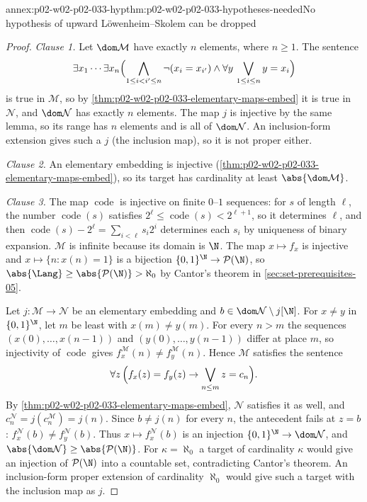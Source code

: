 \begin{annexitem}{annex:p02-w02-p02-033-hyp}{thm:p02-w02-p02-033-hypotheses-needed}{No hypothesis of upward L\"owenheim--Skolem can be dropped}
\begin{proof}
\emph{Clause 1.}  Let \(\dom\mathcal M\) have exactly \(n\) elements, where
\(n\geq1\).  The sentence
\[
 \exists x_1\cdots\exists x_n\Bigl(\bigwedge_{1\leq i<i'\leq n}\neg(x_i=x_{i'})
 \land\forall y\,\bigvee_{1\leq i\leq n}y=x_i\Bigr)
\]
is true in \(\mathcal M\), so by
\cref{thm:p02-w02-p02-033-elementary-maps-embed} it is true in
\(\mathcal N\), and \(\dom\mathcal N\) has exactly \(n\) elements.  The map
\(j\) is injective by the same lemma, so its range has \(n\) elements and is
all of \(\dom\mathcal N\).  An inclusion-form extension gives such a \(j\)
(the inclusion map), so it is not proper either.

\emph{Clause 2.}  An elementary embedding is injective
(\cref{thm:p02-w02-p02-033-elementary-maps-embed}), so its target has
cardinality at least \(\abs{\dom\mathcal M}\).

\emph{Clause 3.}  The map \(\operatorname{code}\) is injective on finite
\(0\)--\(1\) sequences: for \(s\) of length \(\ell\), the number
\(\operatorname{code}(s)\) satisfies
\(2^{\ell}\leq\operatorname{code}(s)<2^{\ell+1}\), so it determines
\(\ell\), and then \(\operatorname{code}(s)-2^{\ell}=\sum_{i<\ell}s_i2^i\)
determines each \(s_i\) by uniqueness of binary expansion.
\(\mathcal M\) is infinite because its domain is \(\N\).  The map
\(x\mapsto f_x\) is injective and \(x\mapsto\{n:x(n)=1\}\) is a bijection
\(\{0,1\}^{\N}\to\mathcal P(\N)\), so
\(\abs{\Lang}\geq\abs{\mathcal P(\N)}>\aleph_0\) by Cantor's theorem in
\cref{sec:set-prerequisites-05}.

Let \(j:\mathcal M\to\mathcal N\) be an elementary embedding and
\(b\in\dom\mathcal N\setminus j[\N]\).  For \(x\ne y\) in
\(\{0,1\}^{\N}\), let \(m\) be least with \(x(m)\ne y(m)\).  For every
\(n>m\) the sequences \((x(0),\ldots,x(n-1))\) and \((y(0),\ldots,y(n-1))\)
differ at place \(m\), so injectivity of \(\operatorname{code}\) gives
\(f_x^{\mathcal M}(n)\ne f_y^{\mathcal M}(n)\).  Hence \(\mathcal M\)
satisfies the sentence
\[
 \forall z\,\Bigl(f_x(z)=f_y(z)\to\bigvee_{n\leq m}z=c_n\Bigr).
\]
By \cref{thm:p02-w02-p02-033-elementary-maps-embed}, \(\mathcal N\)
satisfies it as well, and \(c_n^{\mathcal N}=j(c_n^{\mathcal M})=j(n)\).
Since \(b\ne j(n)\) for every \(n\), the antecedent fails at \(z=b\):
\(f_x^{\mathcal N}(b)\ne f_y^{\mathcal N}(b)\).  Thus
\(x\mapsto f_x^{\mathcal N}(b)\) is an injection
\(\{0,1\}^{\N}\to\dom\mathcal N\), and
\(\abs{\dom\mathcal N}\geq\abs{\mathcal P(\N)}\).  For \(\kappa=\aleph_0\) a
target of cardinality \(\kappa\) would give an injection of
\(\mathcal P(\N)\) into a countable set, contradicting Cantor's theorem.  An
inclusion-form proper extension of cardinality \(\aleph_0\) would give such
a target with the inclusion map as \(j\).
\end{proof}
\end{annexitem}

